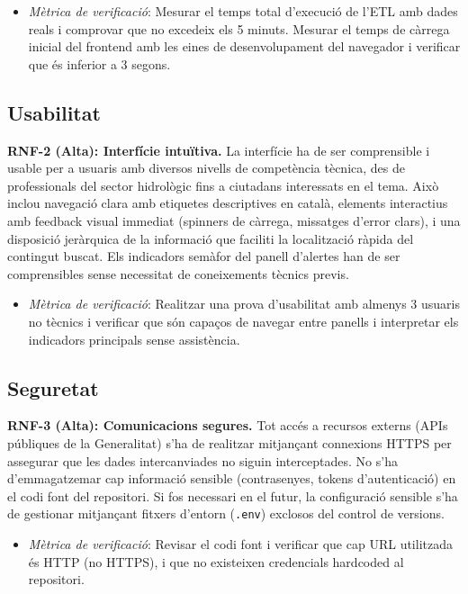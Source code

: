 \begin{itemize}
    \item \textit{Mètrica de verificació}: Mesurar el temps total d'execució de l'ETL amb dades reals i comprovar que no excedeix els 5 minuts. Mesurar el temps de càrrega inicial del frontend amb les eines de desenvolupament del navegador i verificar que és inferior a 3 segons.
\end{itemize}

\subsection{Usabilitat}

\textbf{RNF-2 (Alta): Interfície intuïtiva.} La interfície ha de ser comprensible i usable per a usuaris amb diversos nivells de competència tècnica, des de professionals del sector hidrològic fins a ciutadans interessats en el tema. Això inclou navegació clara amb etiquetes descriptives en català, elements interactius amb feedback visual immediat (spinners de càrrega, missatges d'error clars), i una disposició jeràrquica de la informació que faciliti la localització ràpida del contingut buscat. Els indicadors semàfor del panell d'alertes han de ser comprensibles sense necessitat de coneixements tècnics previs.

\begin{itemize}
    \item \textit{Mètrica de verificació}: Realitzar una prova d'usabilitat amb almenys 3 usuaris no tècnics i verificar que són capaços de navegar entre panells i interpretar els indicadors principals sense assistència.
\end{itemize}

\subsection{Seguretat}

\textbf{RNF-3 (Alta): Comunicacions segures.} Tot accés a recursos externs (APIs públiques de la Generalitat) s'ha de realitzar mitjançant connexions HTTPS per assegurar que les dades intercanviades no siguin interceptades. No s'ha d'emmagatzemar cap informació sensible (contrasenyes, tokens d'autenticació) en el codi font del repositori. Si fos necessari en el futur, la configuració sensible s'ha de gestionar mitjançant fitxers d'entorn (\texttt{.env}) exclosos del control de versions.

\begin{itemize}
    \item \textit{Mètrica de verificació}: Revisar el codi font i verificar que cap URL utilitzada és HTTP (no HTTPS), i que no existeixen credencials hardcoded al repositori.
\end{itemize}

